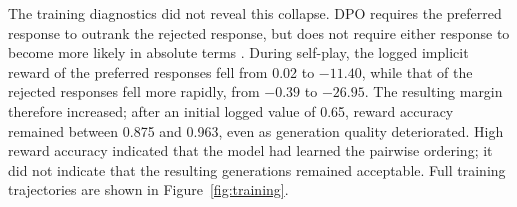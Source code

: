 \documentclass{article}
\begin{document}
The training diagnostics did not reveal this collapse. DPO requires the
preferred response to outrank the rejected response, but does not require
either response to become more likely in absolute terms
\citep{rafailov2023dpo}. During self-play, the logged implicit reward of the
preferred responses fell from 0.02 to $-11.40$, while that of the rejected
responses fell more rapidly, from $-0.39$ to $-26.95$. The resulting margin therefore increased; after an initial logged value of 0.65, reward accuracy remained between 0.875 and 0.963, even as generation quality deteriorated. High reward accuracy indicated that
the model had learned the pairwise ordering; it did not indicate that the
resulting generations remained acceptable. Full training trajectories are
shown in Figure~\ref{fig:training}.





\end{document}

